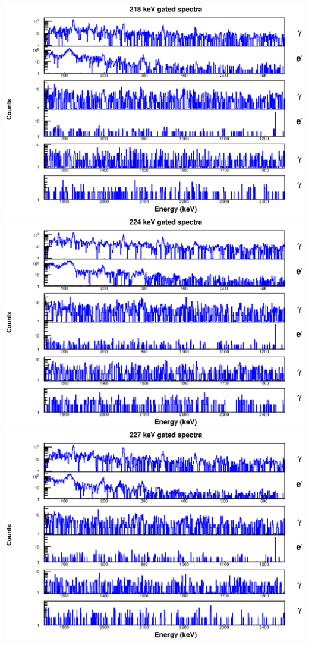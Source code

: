 \begin{landscape}
\includegraphics[scale=1.1]{154Gd_Appendix/218_combined.eps}
\includegraphics[scale=1.1]{154Gd_Appendix/224_combined.eps}
\includegraphics[scale=1.1]{154Gd_Appendix/227_combined.eps}

\end{landscape}
